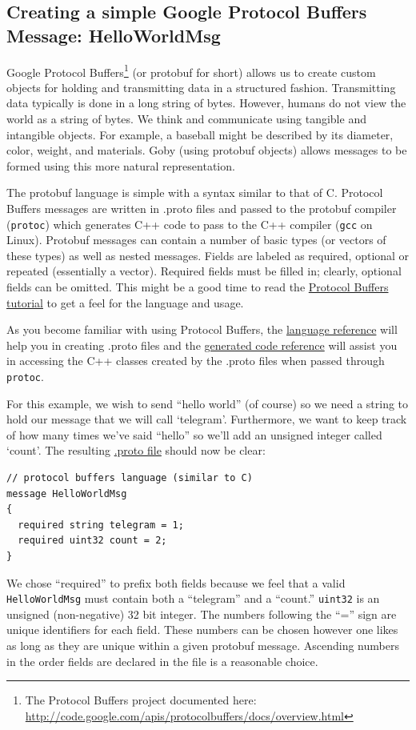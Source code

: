 \documentclass[11pt, letterpaper]{article}
\begin{document}
\subsection{Creating a simple Google Protocol Buffers Message: HelloWorldMsg}\label{sec:proto_ex}

Google Protocol Buffers\footnote{The Protocol Buffers project documented here: \url{http://code.google.com/apis/protocolbuffers/docs/overview.html}} (or protobuf for short) allows us to create custom objects for holding and transmitting data in a structured fashion. Transmitting data typically is done in a long string of bytes. However, humans do not view the world as a string of bytes. We think and communicate using tangible and intangible objects. For example, a baseball might be described by its diameter, color, weight, and materials. Goby (using protobuf objects) allows messages to be formed using this more natural representation.

The protobuf language is simple with a syntax similar to that of C. Protocol Buffers messages are written in .proto files and passed to the protobuf compiler (\texttt{protoc}) which generates C++ code to pass to the C++ compiler (\texttt{gcc} on Linux). Protobuf messages can contain a number of basic types (or vectors of these types) as well as nested messages. Fields are labeled as required, optional or repeated (essentially a vector). Required fields must be filled in; clearly, optional fields can be omitted. This might be a good time to read the \href{http://code.google.com/apis/protocolbuffers/docs/cpptutorial.html}{Protocol Buffers tutorial} to get a feel for the language and usage.

As you become familiar with using Protocol Buffers, the \href{http://code.google.com/apis/protocolbuffers/docs/proto.html}{language reference} will help you in creating .proto files and the \href{http://code.google.com/apis/protocolbuffers/docs/reference/cpp-generated.html}{generated code reference} will assist you in accessing the C++ classes created by the .proto files when passed through \texttt{protoc}.

For this example, we wish to send ``hello world'' (of course) so we need a string to hold our message that we will call `telegram'. Furthermore, we want to keep track of how many times we've said ``hello'' so we'll add an unsigned integer called `count'. The resulting \href{http://bazaar.launchpad.net/~goby-dev/goby/trunk/annotate/head:/src/core/examples/ex1_hello_world/hello_world.proto}{.proto file} should now be clear:
\begin{verbatim}
// protocol buffers language (similar to C)
message HelloWorldMsg
{
  required string telegram = 1;
  required uint32 count = 2;
}
\end{verbatim}
We chose ``required'' to prefix both fields because we feel that a valid \texttt{HelloWorldMsg} must contain both a ``telegram'' and a ``count.'' \texttt{uint32} is an unsigned (non-negative) 32 bit integer. The numbers following the ``='' sign are unique identifiers for each field. These numbers can be chosen however one likes as long as they are unique within a given protobuf message. Ascending numbers in the order fields are declared in the file is a reasonable choice.
\end{document}
